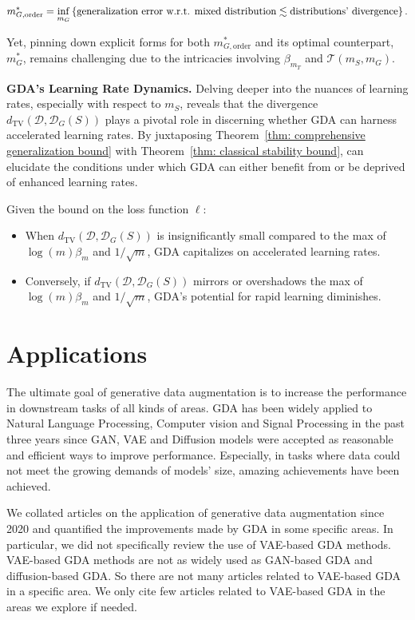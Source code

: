 \documentclass[preprint,12pt,authoryear]{elsarticle}
\newcommand{\sD}{{\mathscr D}}
\newcommand{\sT}{{\mathscr T}}
\newcommand{\DG}{\sD_G(S)}
\begin{document}
\begin{equation*}
    m_{G, \mathrm{order}}^* = \inf_{m_G}\left\{ \text{generalization error w.r.t. mixed distribution} \\ \lesssim \text{distributions' divergence} \right\}.
\end{equation*}

Yet, pinning down explicit forms for both $m_{G, \mathrm{order}}^*$ and its optimal counterpart, $m_G^*$, remains challenging due to the intricacies involving $\beta_{m_T}$ and $\sT(m_S, m_G)$.

\textbf{GDA's Learning Rate Dynamics.} Delving deeper into the nuances of learning rates, especially with respect to $m_S$, reveals that the divergence $d_{\mathrm{TV}} \left(\sD, \DG \right)$ plays a pivotal role in discerning whether GDA can harness accelerated learning rates. By juxtaposing Theorem~\ref{thm: comprehensive generalization bound} with Theorem~\ref{thm: classical stability bound}, \cite{171_theory} can elucidate the conditions under which GDA can either benefit from or be deprived of enhanced learning rates.

Given the bound on the loss function $\ell$:

\begin{itemize}
    \item When $d_{\mathrm{TV}} \left(\sD, \DG \right)$ is insignificantly small compared to the max of $\log(m)\beta_m$ and $1 / \sqrt{m}$, GDA capitalizes on accelerated learning rates.
    \item Conversely, if $d_{\mathrm{TV}} \left(\sD, \DG \right)$ mirrors or overshadows the max of $\log(m)\beta_m$ and $1 / \sqrt{m}$, GDA's potential for rapid learning diminishes.
\end{itemize}



\section{Applications}
The ultimate goal of generative data augmentation is to increase the performance in downstream tasks of all kinds of areas. GDA has been widely applied to Natural Language Processing, Computer vision and Signal Processing in the past three years since GAN, VAE and Diffusion models were accepted as reasonable and efficient ways to improve performance. Especially, in tasks where data could not meet the growing demands of models' size, amazing achievements have been achieved. 

We collated articles on the application of generative data augmentation since 2020 and quantified the improvements made by GDA in some specific areas. In particular, we did not specifically review the use of VAE-based GDA methods. VAE-based GDA methods are not as widely used as GAN-based GDA and diffusion-based GDA. So there are not many articles related to VAE-based GDA in a specific area. We only cite few articles related to VAE-based GDA in the areas we explore if needed.
\end{document}
